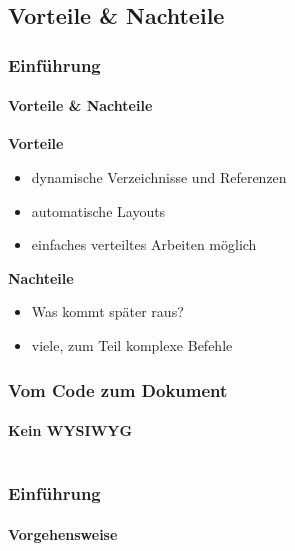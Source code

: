 \subsection{Vorteile \& Nachteile}
\begin{frame}
\frametitle{Einf\"uhrung}
\framesubtitle{Vorteile \& Nachteile}
\textbf{Vorteile}
\begin{itemize}
\item  dynamische Verzeichnisse und Referenzen
\item  automatische Layouts
\item  einfaches verteiltes Arbeiten möglich
\end{itemize}

\textbf{Nachteile}
\begin{itemize}
\item  Was kommt später raus?
\item  viele, zum Teil komplexe Befehle
\end{itemize}
\end{frame}



\begin{frame} 
\frametitle{Vom Code zum Dokument}
\framesubtitle{Kein WYSIWYG} 
\begin{columns}
\begin{column}{.7\textwidth}
\end{column}
\begin{column}{.3\textwidth}
\end{column}
\end{columns}
\end{frame}


\begin{frame}
\frametitle{Einf\"uhrung}
\framesubtitle{Vorgehensweise}
\begin{columns}[onlytextwidth]
\begin{column}{0.40\textwidth}
\end{column}
\begin{column}{0.25\textwidth}
\end{column}
\begin{column}{0.25\textwidth}
\end{column}
\end{columns}
\end{frame}




